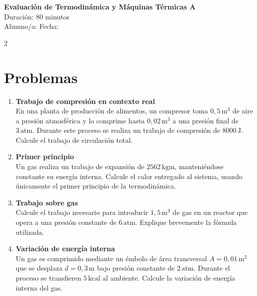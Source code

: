 \documentclass[a4paper,12pt]{article}
\begin{document}

\begin{center}
    \Large \textbf{Evaluación de Termodinámica y Máquinas Térmicas A} \\
    \normalsize Duración: 80 minutos \\
    Alumno/a: \underline{\hspace{6cm}} \hspace{0.5cm} Fecha: \underline{\hspace{2cm}}
\end{center}

\vspace{0.3cm}

\begin{multicols}{2}
\section*{Problemas}
\begin{enumerate}

\item \textbf{Trabajo de compresión en contexto real} \\
En una planta de producción de alimentos, un compresor toma $0{,}5\,\text{m}^3$ de aire a presión atmosférica y lo comprime hasta $0{,}02\,\text{m}^3$ a una presión final de $3\,\text{atm}$. Durante este proceso se realiza un trabajo de compresión de $8000\,\text{J}$. Calcule el trabajo de circulación total.

\vspace{0.3cm}

\item \textbf{Primer principio} \\
Un gas realiza un trabajo de expansión de $2562\,\text{kgm}$, manteniéndose constante su energía interna. Calcule el calor entregado al sistema, usando únicamente el primer principio de la termodinámica.

\vspace{0.3cm}

\item \textbf{Trabajo sobre gas } \\
Calcule el trabajo necesario para introducir $1{,}5\,\text{m}^3$ de gas en un reactor que opera a una presión constante de $6\,\text{atm}$. Explique brevemente la fórmula utilizada.

\vspace{0.3cm}

\item \textbf{Variación de energía interna} \\
Un gas es comprimido mediante un émbolo de área transversal $A = 0{,}01\,\text{m}^2$ que se desplaza $d = 0{,}3\,\text{m}$ bajo presión constante de $2\,\text{atm}$. Durante el proceso se transfieren $5\,\text{kcal}$ al ambiente. Calcule la variación de energía interna del gas.


\end{enumerate}
\end{multicols}
\end{document}
